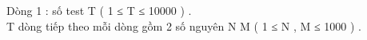 Dòng 1 : số test T ( 1 ≤ T ≤ 10000 ) .   
\\   T dòng tiếp theo mỗi dòng gồm 2 số nguyên N M ( 1 ≤ N , M ≤ 1000 ) .